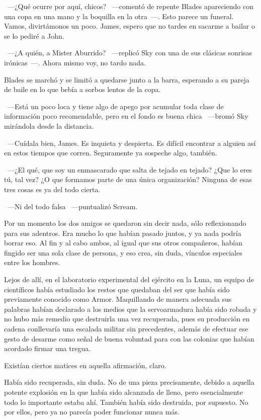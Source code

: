 ~---¿Qué ocurre por aquí, chicos? ~---comentó de repente Blades apareciendo con una copa en una mano y la boquilla en la otra~---. Esto parece un funeral. Vamos, divirtámonos un poco. James, espero que no tardes en sacarme a bailar o se lo pediré a John.

~---¿A quién, a Mister Aburrido? ~---replicó Sky con una de sus clásicas sonrisas irónicas~---. Ahora mismo voy, no tardo nada.

Blades se marchó y se limitó a quedarse junto a la barra, esperando a su pareja de baile en lo que bebía a sorbos lentos de la copa.

~---Está un poco loca y tiene algo de apego por acumular toda clase de información poco recomendable, pero en el fondo es buena chica ~---bromó Sky mirándola desde la distancia.

~---Cuídala bien, James. Es inquieta y despierta. Es difícil encontrar a alguien así en estos tiempos que corren. Seguramente ya sospeche algo, también.

~---¿El qué, que soy un enmascarado que salta de tejado en tejado? ¿Que lo eres tú, tal vez? ¿O que formamos parte de una única organización? Ninguna de esas tres cosas es ya del todo cierta.

~---Ni del todo falsa ~---puntualizó Scream.

Por un momento los dos amigos se quedaron sin decir nada, sólo reflexionando para sus adentros. Era mucho lo que habían pasado juntos, y ya nada podría borrar eso. Al fin y al cabo ambos, al igual que sus otros compañeros, habían fingido ser una sola clase de persona, y eso crea, sin duda, vínculos especiales entre los hombres.

\bigskip\noindent
Lejos de allí, en el laboratorio experimental del ejército en la Luna, un equipo de científicos había estudiado los restos que quedaban del ser que había sido previamente conocido como Armor. Maquillando de manera adecuada sus palabras habían declarado a los medios que la servoarmadura había sido robada y no hubo más remedio que destruirla una vez recuperada, pues su producción en cadena conllevaría una escalada militar sin precedentes, además de efectuar ese gesto de desarme como señal de buena voluntad para con las colonias que habían acordado firmar una tregua.

Existían ciertos matices en aquella afirmación, claro.

Había sido recuperada, sin duda. No de una pieza precisamente, debido a aquella potente explosión en la que había sido alcanzada de lleno, pero esencialmente todo lo importante estaba ahí. También había sido destruida, por supuesto. No por ellos, pero ya no parecía poder funcionar nunca más.

